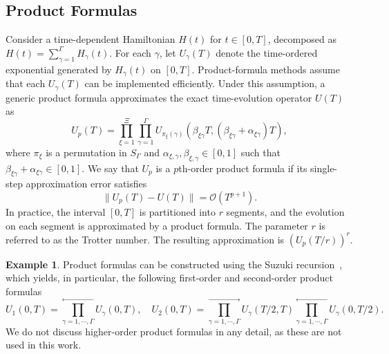 \documentclass[10pt,reqno]{article}
\numberwithin{equation}{section}
\theoremstyle{plain}
\theoremstyle{definition}
\newtheorem{example}[thm]{Example}
\begin{document}
\subsection{Product Formulas}\label{sec:product}
Consider a time-dependent Hamiltonian \(H(t)\) for \(t \in [0,T]\), decomposed as \(H(t)=\sum_{\gamma=1}^{\Gamma} H_{\gamma}(t)\). For each \(\gamma\), let \(U_{\gamma}(T)\) denote the time-ordered exponential generated by \(H_{\gamma}(t)\) on \([0,T]\). Product-formula methods assume that each \(U_{\gamma}(T)\) can be implemented efficiently. Under this assumption, a generic product formula approximates the exact time-evolution operator \(U(T)\) as
\begin{equation}\label{generic-prod}
U_p(T) = \prod_{\xi=1}^{\Xi} \prod_{\gamma=1}^{\Gamma} U_{\pi_\xi(\gamma)}(\beta_{\xi \gamma} T,(\beta_{\xi \gamma} + \alpha_{\xi \gamma})T),
\end{equation}
where $\pi_\xi$ is a permutation in $S_{\Gamma}$ and $\alpha_{\xi,\gamma},\beta_{\xi,\gamma}\in[0,1]$ such that $\beta_{\xi \gamma} + \alpha_{\xi \gamma} \in [0,1]$. We say that $U_p$ is a $p$th-order product formula if its single-step approximation error satisfies
\begin{equation}
\|U_p(T)-U(T)\| = \mathcal{O}(T^{p+1}).
\end{equation}
In practice, the interval \([0,T]\) is partitioned into \(r\) segments, and the evolution on each segment is approximated by a product formula. The parameter \(r\) is referred to as the Trotter number. The resulting approximation is \((U_p(T/r))^r\).

\begin{example}
Product formulas can be constructed using the Suzuki recursion~\cite{suzuki1985decomposition,suzuki1991general}, which yields, in particular, the following first-order and second-order product formulas
\begin{equation}
U_1(0,T) = \overset{\longleftarrow}{\prod_{\gamma=1,\cdots,\Gamma}} U_\gamma(0,T), \quad U_2(0,T) = \overset{\longrightarrow}{\prod_{\gamma=1,\cdots,\Gamma}} U_\gamma(T/2,T) \overset{\longleftarrow}{\prod_{\gamma=1,\cdots,\Gamma}} U_\gamma(0,T/2).
\end{equation}
We do not discuss higher-order product formulas in any detail, as these are not used in this work.
\end{example}
\end{document}
